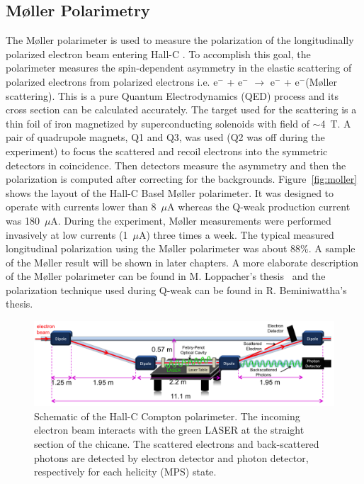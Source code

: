 \subsection{M{\o}ller Polarimetry}%
\label{Moller Polarimetry}
The M{\o}ller polarimeter is used to measure the polarization of the longitudinally polarized electron beam entering Hall-C \cite{Hauger2001382}. To accomplish this goal, the polarimeter measures the spin-dependent asymmetry in the elastic scattering of polarized electrons from polarized electrons i.e. e$^{-}$ + e$^{-}$ $\rightarrow$ e$^{-}$ + e$^{-}$(M{\o}ller scattering). This is a pure Quantum Electrodynamics (QED) process and its cross section can be calculated accurately. The target used for the scattering is a thin foil of iron magnetized by superconducting solenoids with field of $\sim$4~T. A pair of quadrupole magnets, Q1 and Q3, was used (Q2 was off during the experiment) to focus the scattered and recoil electrons into the symmetric detectors in coincidence. Then detectors measure the asymmetry and then the polarization is computed after correcting for the backgrounds. Figure~\ref{fig:moller} shows the layout of the Hall-C Basel M{\o}ller polarimeter. It was designed to operate with currents lower than 8~$\mu$A whereas the Q-weak production current was 180~$\mu$A. During the experiment, M{\o}ller measurements were performed invasively at low currents (1~$\mu$A) three times a week. The typical measured longitudinal polarization using the M{\o}ller polarimeter was about 88\%. A sample of the M{\o}ller result will be shown in later chapters.  A more elaborate description of the M{\o}ller polarimeter can be found in M. Loppacher's thesis~\cite{Loppacher_moeller_thesis} and the polarization technique used during Q-weak can be found in R. Beminiwattha's~\cite{rakitha_qweak} thesis.

\begin{singlespace}
\begin{figure}[!h]
	\begin{center}
	\includegraphics[width=15cm]{figures/compton}
	\caption
	{Schematic of the Hall-C Compton polarimeter. The incoming electron beam interacts with the green LASER at the straight section of the chicane. The scattered electrons and back-scattered photons are detected by electron detector and photon detector, respectively for each helicity (MPS) state.}
	\label{fig:compton}
	\end{center}
\end{figure}
\end{singlespace}

